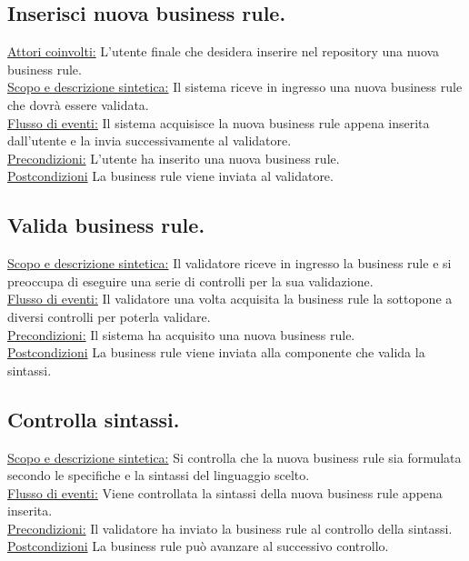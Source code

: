 \documentclass[11pt,titlepage,a4paper]{report}
\begin{document}
\subsection{Inserisci nuova business rule.}
\underline{Attori coinvolti:} L'utente finale che desidera inserire nel repository una nuova business rule.\\
\underline{Scopo e descrizione sintetica:} Il sistema riceve in ingresso una nuova business rule che dovr\`a essere validata.\\
\underline{Flusso di eventi:} Il sistema acquisisce la nuova business rule appena inserita dall'utente e la invia successivamente al validatore.\\
\underline{Precondizioni:} L'utente ha inserito una nuova business rule.\\
\underline{Postcondizioni} La business rule viene inviata al validatore.

\subsection{Valida business rule.}
\underline{Scopo e descrizione sintetica:} Il validatore riceve in ingresso la business rule e si preoccupa di eseguire una serie di controlli per la sua validazione.\\
\underline{Flusso di eventi:} Il validatore una volta acquisita la business rule la sottopone a diversi controlli per poterla validare.\\
\underline{Precondizioni:} Il sistema ha acquisito una nuova business rule.\\
\underline{Postcondizioni} La business rule viene inviata alla componente che valida la sintassi.
 
\subsection{Controlla sintassi.}
\underline{Scopo e descrizione sintetica:} Si controlla che la nuova business rule sia formulata secondo le specifiche e la sintassi del linguaggio scelto.\\
\underline{Flusso di eventi:} Viene controllata la sintassi della nuova business rule appena inserita.\\
\underline{Precondizioni:} Il validatore ha inviato la business rule al controllo della sintassi.\\
\underline{Postcondizioni} La business rule pu\`o avanzare al successivo controllo.
\end{document}
